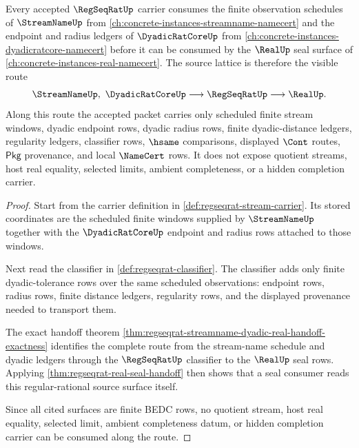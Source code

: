 \begin{theorem}
\label{thm:regseqrat-l10-source-lattice-pointer}
Every accepted $\RegSeqRatUp$ carrier consumes the finite observation schedules
of $\StreamNameUp$ from
\autoref{ch:concrete-instances-streamname-namecert} and the endpoint and
radius ledgers of $\DyadicRatCoreUp$ from
\autoref{ch:concrete-instances-dyadicratcore-namecert} before it can be
consumed by the $\RealUp$ seal surface of
\autoref{ch:concrete-instances-real-namecert}. The source lattice is therefore
the visible route
$$
\StreamNameUp,\ \DyadicRatCoreUp \longrightarrow \RegSeqRatUp \longrightarrow \RealUp .
$$
Along this route the accepted packet carries only scheduled finite stream
windows, dyadic endpoint rows, dyadic radius rows, finite dyadic-distance
ledgers, regularity ledgers, classifier rows, $\hsame$ comparisons, displayed
$\Cont$ routes, $\mathsf{Pkg}$ provenance, and local $\NameCert$ rows. It
does not expose quotient streams, host real equality, selected limits, ambient
completeness, or a hidden completion carrier.
\end{theorem}
\begin{proof}
Start from the carrier definition in \autoref{def:regseqrat-stream-carrier}.
Its stored coordinates are the scheduled finite windows supplied by
$\StreamNameUp$ together with the $\DyadicRatCoreUp$ endpoint and radius rows
attached to those windows.

Next read the classifier in \autoref{def:regseqrat-classifier}. The classifier
adds only finite dyadic-tolerance rows over the same scheduled observations:
endpoint rows, radius rows, finite distance ledgers, regularity rows, and the
displayed provenance needed to transport them.

The exact handoff theorem
\autoref{thm:regseqrat-streamname-dyadic-real-handoff-exactness} identifies
the complete route from the stream-name schedule and dyadic ledgers through
the $\RegSeqRatUp$ classifier to the $\RealUp$ seal rows. Applying
\autoref{thm:regseqrat-real-seal-handoff} then shows that a seal consumer
reads this regular-rational source surface itself.

Since all cited surfaces are finite BEDC rows, no quotient stream, host real
equality, selected limit, ambient completeness datum, or hidden completion
carrier can be consumed along the route.
\end{proof}

